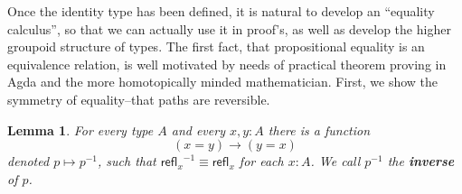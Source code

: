 \documentclass[11pt, a4paper]{article}
\newtheorem{lem}{Lemma}
\newcommand{\jdeq}{\equiv}      %
\newcommand{\refl}[1]{\ensuremath{\mathsf{refl}_{#1}}\xspace}
\newcommand{\define}[1]{\textbf{#1}}
\newcommand{\opp}[1]{\mathord{{#1}^{-1}}}
\begin{document}
Once the identity type has been defined, it is natural to develop an ``equality
calculus'',  so that we can actually use it in proof's, as well as develop the
higher groupoid structure of types. The first fact, that propositional equality
is an equivalence relation, is well motivated by needs of practical theorem
proving in Agda and the more homotopically minded mathematician. First, we show the symmetry of equality--that paths are reversible.

\begin{lem}\label{lem:opp}
  For every type $A$ and every $x,y:A$ there is a function
  \begin{equation*}
    (x= y)\to(y= x)
  \end{equation*}
  denoted $p\mapsto \opp{p}$, such that $\opp{\refl{x}}\jdeq\refl{x}$ for each $x:A$.
  We call $\opp{p}$ the \define{inverse} of $p$.
\end{lem}
\end{document}
